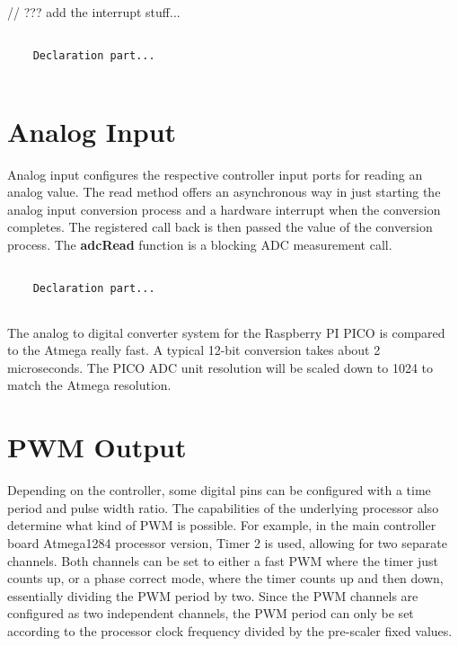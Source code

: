 // ??? add the interrupt stuff...

\lstset{language=c++, style=codesnippetstyle}
\begin{lstlisting}
   
    Declaration part...
    
\end{lstlisting}
\FloatBarrier

\section{Analog Input}

Analog input configures the respective controller input ports for reading an analog value. The read method offers an asynchronous way in just starting the analog input conversion process and a hardware interrupt when the conversion completes. The registered call back is then passed the value of the conversion process. The \textbf{adcRead} function is a blocking ADC measurement call.

\lstset{language=c++, style=codesnippetstyle}
\begin{lstlisting}
   
    Declaration part...
    
\end{lstlisting}
\FloatBarrier

The analog to digital converter system for the Raspberry PI PICO is compared to the Atmega really fast. A typical 12-bit conversion takes about 2 microseconds. The PICO ADC unit resolution will be scaled down to 1024 to match the Atmega resolution.

\section{PWM Output}

Depending on the controller, some digital pins can be configured with a time period and pulse width ratio. The capabilities of the underlying processor also determine what kind of PWM is possible. For example, in the main controller board Atmega1284 processor version, Timer 2 is used, allowing for two separate channels. Both channels can be set to either a fast PWM where the timer just counts up, or a phase correct mode, where the timer counts up and then down, essentially dividing the PWM period by two. Since the PWM channels are configured as two independent channels, the PWM period can only be set according to the processor clock frequency divided by the pre-scaler fixed values.

